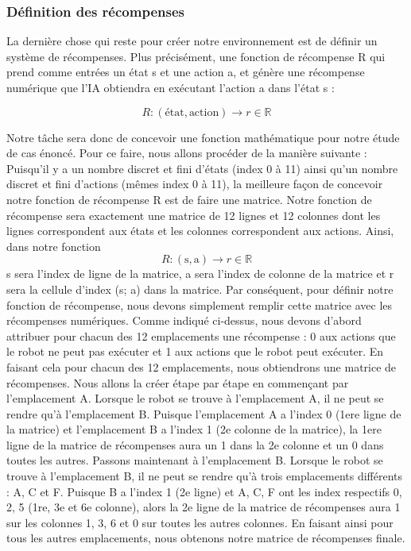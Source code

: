 \documentclass{article}
\begin{document}
\subsubsection{Définition des récompenses}
La dernière chose qui reste pour créer notre environnement est de définir un système de récompenses.  Plus précisément, une fonction de récompense R qui prend comme entrées un état s et une action a, et génère une récompense numérique que l'IA obtiendra en exécutant l'action a dans l'état s :

\[ R: (\text{état}, \text{action}) \rightarrow r \in \mathbb{R} \]

Notre tâche sera donc de concevoir une fonction mathématique pour notre étude de cas énoncé. Pour ce faire, nous allons procéder de la manière suivante : 
Puisqu'il y a un nombre discret et fini d'états (index 0 à 11) ainsi qu'un nombre discret et fini d'actions (mêmes index 0 à 11), la meilleure façon de concevoir notre fonction de récompense R est de faire une matrice. Notre fonction de récompense sera exactement une matrice de 12 lignes et 12 colonnes dont les lignes correspondent aux états et les colonnes correspondent aux actions. Ainsi, dans notre fonction  \[ R: (\text{s}, \text{a}) \rightarrow r \in \mathbb{R} \] s sera l'index de ligne de la matrice, a sera l'index de colonne de la matrice et r sera la cellule d'index (s; a) dans la matrice. Par conséquent, pour définir notre fonction de récompense, nous devons simplement remplir cette matrice avec les récompenses numériques. Comme indiqué ci-dessus, nous devons d'abord attribuer pour chacun des 12 emplacements une récompense : 0 aux actions que le robot ne peut pas exécuter et 1 aux actions que le robot peut exécuter. En faisant cela pour chacun des 12 emplacements, nous obtiendrons une matrice de récompenses. Nous allons la créer étape par étape en commençant par l'emplacement A. Lorsque le robot se trouve à l'emplacement A, il ne peut se rendre qu'à l'emplacement B. Puisque l'emplacement
A a l'index 0 (1ere ligne de la matrice) et l'emplacement B a l'index 1 (2e colonne de la matrice), la 1ere ligne de la matrice de récompenses aura un 1 dans la 2e colonne et un 0 dans toutes les autres. Passons maintenant à l'emplacement B. Lorsque le robot se trouve à l'emplacement B, il ne peut se rendre qu'à trois emplacements différents : A, C et F. Puisque B a l'index 1 (2e ligne) et A, C, F ont les index respectifs 0, 2, 5 (1re, 3e et 6e colonne), alors la 2e ligne de la matrice de récompenses aura 1 sur les colonnes 1, 3, 6 et 0 sur toutes les autres colonnes. En faisant ainsi pour tous les autres emplacements, nous obtenons notre matrice de récompenses finale.
\end{document}
